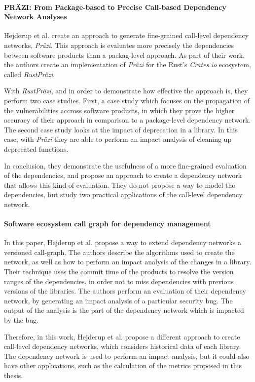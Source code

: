 \paragraph{PRÄZI: From Package-based to Precise Call-based Dependency Network Analyses \cite{hejderup2018prazi}}
Hejderup et al. create an approach to generate fine-grained call-level dependency networks, \textit{Präzi}. This approach is evaluates more precisely the dependencies between software products than a packag-level approach. As part of their work, the authors create an implementation of \textit{Präzi} for the Rust's \textit{Crates.io} ecosystem, called \textit{RustPräzi}.

With \textit{RustPräzi}, and in order to demonstrate how effective the approach is, they perform two case studies. First, a case study which focuses on the propagation of the vulnerabilities accross software products, in which they prove the higher accuracy of their approach in comparison to a package-level dependency network. The second case study looks at the impact of deprecation in a library. In this case, with \textit{Präzi} they are able to perform an impact analysis of cleaning up deprecated functions.

In conclusion, they demonstrate the usefulness of a more fine-grained evaluation of the dependencies, and propose an approach to create a dependency network that allows this kind of evaluation. They do not propose a way to model the dependencies, but study two practical applications of the call-level dependency network.

\paragraph{Software ecosystem call graph for dependency management \cite{hejderup2018software}}
In this paper, Hejderup et al. propose a way to extend dependency networks a versioned call-graph. The authors describe the algorithms used to create the network, as well as how to perform an impact analysis of the changes in a library. Their technique uses the commit time of the products to resolve the version ranges of the dependencies, in order not to miss dependencies with previous versions of the libraries. The authors perform an evaluation of their dependency network, by generating an impact analysis of a particular security bug. The output of the analysis is the part of the dependency network which is impacted by the bug.

Therefore, in this work, Hejderup et al. propose a different approach to create call-level dependency networks, which considers historical data of each library. The dependency network is used to perform an impact analysis, but it could also have other applications, such as the calculation of the metrics proposed in this thesis.

